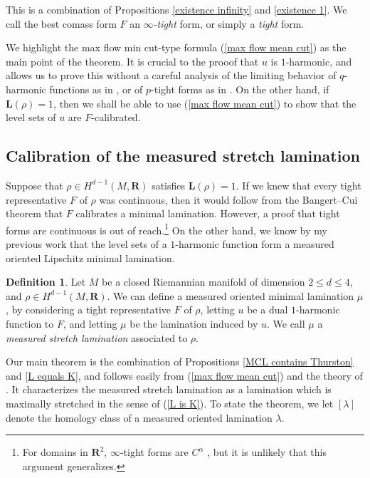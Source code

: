 \documentclass[reqno,11pt]{amsart}
\newcommand{\RR}{\mathbf{R}}
\newcommand{\Comass}{\mathbf L}
\newcommand{\dfn}[1]{\emph{#1}\index{#1}}
\theoremstyle{definition}
\newtheorem{definition}[theorem]{Definition}
\numberwithin{equation}{section}
\begin{document}
This is a combination of Propositions \ref{existence infinity} and \ref{existence 1}.
We call the best comass form $F$ an \dfn{$\infty$-tight} form, or simply a \dfn{tight} form.

We highlight the max flow min cut-type formula (\ref{max flow mean cut}) as the main point of the theorem.
It is crucial to the prooof that $u$ is $1$-harmonic, and allows us to prove this without a careful analysis of the limiting behavior of $q$-harmonic functions as in \cite[Theorem 2.4]{Mazon14}, or of $p$-tight forms as in \cite[\S6]{daskalopoulos2020transverse}.
On the other hand, if $\Comass(\rho) = 1$, then we shall be able to use (\ref{max flow mean cut}) to show that the level sets of $u$ are $F$-calibrated.


\subsection{Calibration of the measured stretch lamination}
Suppose that $\rho \in H^{d - 1}(M, \RR)$ satisfies $\Comass(\rho) = 1$.
If we knew that every tight representative $F$ of $\rho$ was continuous, then it would follow from the Bangert--Cui theorem that $F$ calibrates a minimal lamination.
However, a proof that tight forms are continuous is out of reach.\footnote{For domains in $\RR^2$, $\infty$-tight forms are $C^\alpha$ \cite{Evans08}, but it is unlikely that this argument generalizes.}
On the other hand, we know by my previous work \cite[Theorem C]{BackusCML} that the level sets of a $1$-harmonic function form a measured oriented Lipschitz minimal lamination.

\begin{definition}
Let $M$ be a closed Riemannian manifold of dimension $2 \leq d \leq 4$, and $\rho \in H^{d - 1}(M, \RR)$.
We can define a measured oriented minimal lamination $\mu$, by considering a tight representative $F$ of $\rho$, letting $u$ be a dual $1$-harmonic function to $F$, and letting $\mu$ be the lamination induced by $u$.
We call $\mu$ a \dfn{measured stretch lamination} associated to $\rho$.
\end{definition}

Our main theorem is the combination of Propositions \ref{MCL contains Thurston} and \ref{L equals K}, and follows easily from (\ref{max flow mean cut}) and the theory of \cite{BackusFLG, BackusCML}.
It characterizes the measured stretch lamination as a lamination which is maximally stretched in the sense of (\ref{L is K}).
To state the theorem, we let $[\lambda]$ denote the homology class of a measured oriented lamination $\lambda$.
\end{document}
